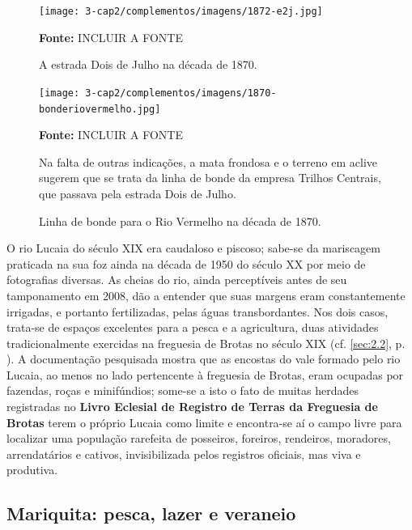 \begin{figure}
\caption{A estrada Dois de Julho na década de 1870.}
\centering
\texttt{[image: 3-cap2/complementos/imagens/1872-e2j.jpg]}{\footnotesize \par \textbf{Fonte:} INCLUIR A FONTE } 
\label{fig:1872-e2j}
\end{figure}

\begin{figure}
\caption{Linha de bonde para o Rio Vermelho na década de 1870.}
\centering
\texttt{[image: 3-cap2/complementos/imagens/1870-bonderiovermelho.jpg]}{\footnotesize \par \textbf{Fonte:} INCLUIR A FONTE \par Na falta de outras indicações, a mata frondosa e o terreno em aclive sugerem que se trata da linha de bonde da empresa Trilhos Centrais, que passava pela estrada Dois de Julho.} 
\label{fig:1870-bonderiovermelho}
\end{figure}

O rio Lucaia do século XIX era caudaloso e piscoso; sabe-se da mariscagem praticada na sua foz ainda na década de 1950 do século XX por meio de fotografias diversas. As cheias do rio, ainda perceptíveis antes de seu tamponamento em 2008, dão a entender que suas margens eram constantemente irrigadas, e portanto fertilizadas, pelas águas transbordantes. Nos dois casos, trata-se de espaços excelentes para a pesca e a agricultura, duas atividades tradicionalmente exercidas na freguesia de Brotas no século XIX (cf. \autoref{sec:2.2}, p. \pageref{sec:2.2}). A documentação pesquisada mostra que as encostas do vale formado pelo rio Lucaia, ao menos no lado pertencente à freguesia de Brotas, eram ocupadas por fazendas, roças e minifúndios; some-se a isto o fato de muitas herdades registradas no \textbf{Livro Eclesial de Registro de Terras da Freguesia de Brotas} terem o próprio Lucaia como limite e encontra-se aí o campo livre para localizar uma população rarefeita de posseiros, foreiros, rendeiros, moradores, arrendatários e cativos, invisibilizada pelos registros oficiais, mas viva e produtiva.

\subsection{Mariquita: pesca, lazer e veraneio}\label{subsec:mariq}

